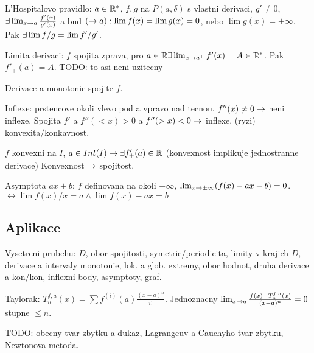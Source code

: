 L'Hospitalovo pravidlo: $a\in\mathbb{R}^*$, $f,g$ na $P(a,\delta)$ s vlastni derivaci,
$g'\neq 0$, $\exists\lim_{x\rightarrow a}\frac{f'(x)}{g'(x)}$ a
bud $(\rightarrow a): \lim f(x)=\lim g(x)=0$, nebo $\lim g(x)=\pm\infty$.
Pak $\exists\lim f/g=\lim f'/g'$.

Limita derivaci: $f$ spojita zprava, pro $a\in\mathbb{R} \exists\lim_{x\rightarrow
a^+}f'(x)=A\in\mathbb{R}^*$. Pak $f'_+(a)=A$.
TODO: to asi neni uzitecny

Derivace a monotonie spojite $f$.

Inflexe: prstencove okoli vlevo pod a vpravo nad tecnou.
$f''(x)\neq 0\rightarrow$ neni inflexe.
Spojita $f'$ a $f''(<x)>0$ a $f''(>x)<0\rightarrow$ inflexe.
(ryzi) konvexita/konkavnost.

$f$ konvexni na $I$, $a\in Int(I)\rightarrow\exists f'_\pm(a)\in\mathbb{R}$ (konvexnost implikuje
jednostranne derivace)
Konvexnost $\rightarrow$ spojitost.

Asymptota $ax+b$: $f$ definovana na okoli $\pm\infty$,
$\lim_{x\rightarrow\pm\infty}(f(x)-ax-b)=0$.
$\leftrightarrow\lim f(x)/x=a \wedge \lim f(x)-ax=b$

\subsection{Aplikace}

Vysetreni prubehu: $D$, obor spojitosti, symetrie/periodicita,
limity v krajich $D$, derivace a intervaly monotonie, lok. a glob. extremy,
obor hodnot, druha derivace a kon/kon, inflexni body, asymptoty, graf.

Taylorak: $T_n^{f,a}(x)=\sum f^{(i)}(a)\frac{(x-a)^n}{i!}$.
Jednoznacny $\lim_{x\rightarrow a}\frac{f(x)-T_n^{f,a}(x)}{(x-a)^n}=0$ stupne $\leq n$.

TODO: obecny tvar zbytku a dukaz, Lagrangeuv a Cauchyho tvar zbytku,
Newtonova metoda.
